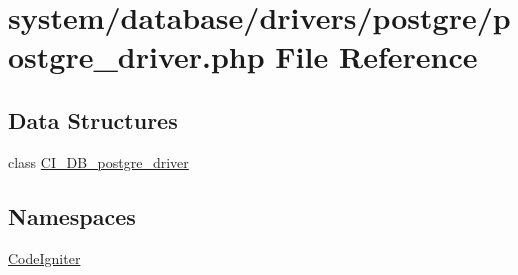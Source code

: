 \hypertarget{postgre__driver_8php}{}\section{system/database/drivers/postgre/postgre\+\_\+driver.php File Reference}
\label{postgre__driver_8php}
\subsection*{Data Structures}
\begin{DoxyCompactItemize}
\item 
class \mbox{\hyperlink{class_c_i___d_b__postgre__driver}{C\+I\+\_\+\+D\+B\+\_\+postgre\+\_\+driver}}
\end{DoxyCompactItemize}
\subsection*{Namespaces}
\begin{DoxyCompactItemize}
\item 
 \mbox{\hyperlink{namespace_code_igniter}{Code\+Igniter}}
\end{DoxyCompactItemize}
